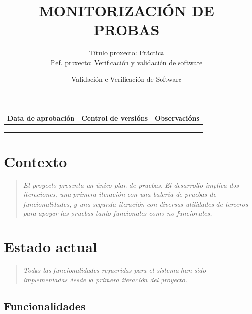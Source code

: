 \documentclass[DIV=calc,paper=a4,fontsize=11pt,onecolumn]{scrartcl}	 %
\title{MONITORIZACIÓN DE PROBAS} %
\author{Título proxecto: Práctica \\
	Ref. proxecto: Verificación y validación de software}
\date{\sffamily Validación e Verificación de Software} %
\newcommand{\hint}[1]{\begin{quote}\itshape #1 \end{quote}}
\begin{document}
\maketitle %
\thispagestyle{fancy} %


\vspace*{1cm}

\begin{center}
\small \sffamily
\begin{tabular}{c|c|c}
Data de aprobación & Control de versións & Observacións \\ \hline
& & \\ \hline
& & \\ \hline
& & \\
\end{tabular}
\end{center}

\clearpage


\section{Contexto}

\hint{El proyecto presenta un único plan de pruebas.
	El desarrollo implica dos iteraciones, una primera iteración con una batería de pruebas de funcionalidades, y una segunda iteración con 
	diversas utilidades de terceros para apoyar las pruebas tanto funcionales como no funcionales.}

\section{Estado actual}

\hint{ Todas las funcionalidades requeridas para el sistema han sido implementadas desde la primera iteración del proyecto.}

\subsection{Funcionalidades}
\end{document}
